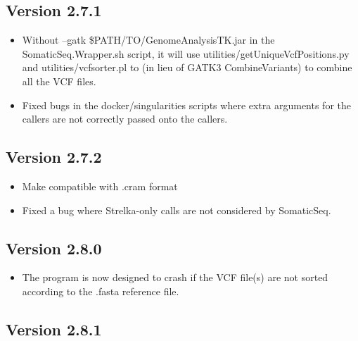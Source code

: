 \documentclass[10pt,letterpaper]{article}
\begin{document}
\begin{sloppypar}
\begin{itemize}
\end{itemize}


\subsection{Version 2.7.1}

\begin{itemize}

  \item
  Without --gatk \$PATH/TO/GenomeAnalysisTK.jar in the SomaticSeq.Wrapper.sh script, it will use utilities/getUniqueVcfPositions.py and utilities/vcfsorter.pl to (in lieu of GATK3 CombineVariants) to combine all the VCF files. 

  \item
  Fixed bugs in the docker/singularities scripts where extra arguments for the callers are not correctly passed onto the callers. 

\end{itemize}




\subsection{Version 2.7.2}

\begin{itemize}

  \item
  Make compatible with .cram format
  
  \item
  Fixed a bug where Strelka-only calls are not considered by SomaticSeq. 
  
\end{itemize}



\subsection{Version 2.8.0}

\begin{itemize}

  \item
  The program is now designed to crash if the VCF file(s) are not sorted according to the .fasta reference file. 
  
\end{itemize}



\subsection{Version 2.8.1}


\end{sloppypar}
\end{document}
